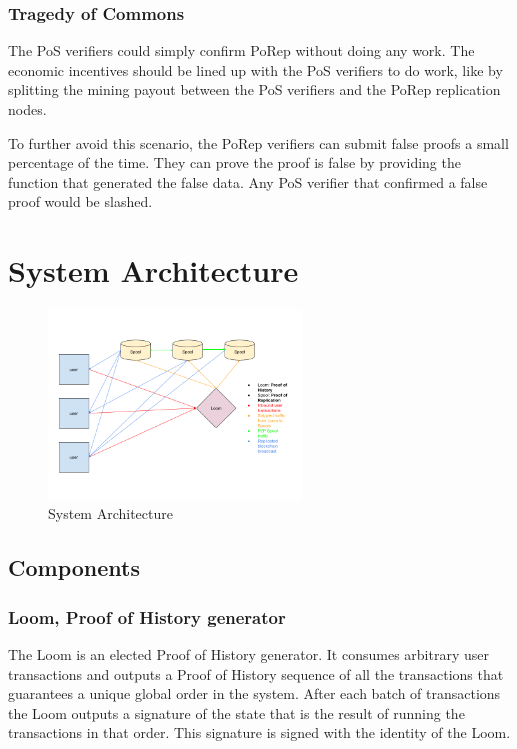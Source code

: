 \documentclass[12pt]{article}
\begin{document}
\subsubsection{Tragedy of Commons}

The PoS verifiers could simply confirm PoRep without doing any work. The economic incentives should be lined up with the PoS verifiers to do work, like by splitting the mining payout between the PoS verifiers and the PoRep replication nodes.

To further avoid this scenario, the PoRep verifiers can submit false proofs a small percentage of the time.  They can prove the proof is false by providing the function that generated the false data.  Any PoS verifier that confirmed a false proof would be slashed.

\section{System Architecture}\label{system_architecture}

\begin{figure}
  \begin{center}
    \centering
    \includegraphics[width=0.6\textwidth]{figures/fig_9.png}
    \caption[Fig 9]{System Architecture \label{fig_9}}
  \end{center}
  \end{figure}

\subsection{Components}

\subsubsection{Loom, Proof of History generator}
The Loom is an elected Proof of History generator. It consumes arbitrary user transactions and outputs a Proof of History sequence of all the transactions that guarantees a unique global order in the system. After each batch of transactions the Loom outputs a signature of the state that is the result of running the transactions in that order. This signature is signed with the identity of the Loom.
\end{document}
